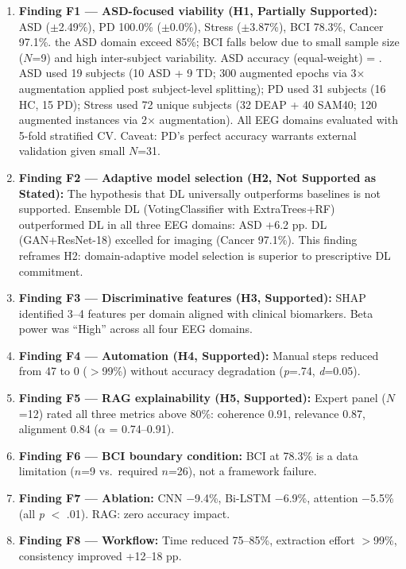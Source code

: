 \begin{enumerate}
  \item \textbf{Finding F1 --- ASD-focused viability (H1, Partially Supported):} ASD \asdacc{} ($\pm$2.49\%), PD 100.0\% ($\pm$0.0\%), Stress \stressacc{} ($\pm$3.87\%), BCI 78.3\%, Cancer 97.1\%. the ASD domain exceed 85\%; BCI falls below due to small sample size ($N$=9) and high inter-subject variability. ASD accuracy (equal-weight) = \asdacc{}. ASD used 19 subjects (10 ASD + 9 TD; 300 augmented epochs via 3$\times$ augmentation applied post subject-level splitting); PD used 31 subjects (16 HC, 15 PD); Stress used 72 unique subjects (32 DEAP + 40 SAM40; 120 augmented instances via 2$\times$ augmentation). All EEG domains evaluated with 5-fold stratified CV. Caveat: PD's perfect accuracy warrants external validation given small $N$=31.
  \item \textbf{Finding F2 --- Adaptive model selection (H2, Not Supported as Stated):} The hypothesis that DL universally outperforms baselines is not supported. Ensemble DL (VotingClassifier with ExtraTrees+RF) outperformed DL in all three EEG domains: ASD +6.2 pp. DL (GAN+ResNet-18) excelled for imaging (Cancer 97.1\%). This finding reframes H2: domain-adaptive model selection is superior to prescriptive DL commitment.
  \item \textbf{Finding F3 --- Discriminative features (H3, Supported):} SHAP identified 3--4 features per domain aligned with clinical biomarkers. Beta power was ``High'' across all four EEG domains.
  \item \textbf{Finding F4 --- Automation (H4, Supported):} Manual steps reduced from 47 to 0 ($>$99\%) without accuracy degradation (\textit{p}=.74, \textit{d}=0.05).
  \item \textbf{Finding F5 --- RAG explainability (H5, Supported):} Expert panel ($N$=12) rated all three metrics above 80\%: coherence 0.91, relevance 0.87, alignment 0.84 ($\alpha$ = 0.74--0.91).
  \item \textbf{Finding F6 --- BCI boundary condition:} BCI at 78.3\% is a data limitation ($n$=9 vs.\ required $n$=26), not a framework failure.
  \item \textbf{Finding F7 --- Ablation:} CNN $-$9.4\%, Bi-LSTM $-$6.9\%, attention $-$5.5\% (all \textit{p} $<$ .01). RAG: zero accuracy impact.
  \item \textbf{Finding F8 --- Workflow:} Time reduced 75--85\%, extraction effort $>$99\%, consistency improved +12--18 pp.
\end{enumerate}

